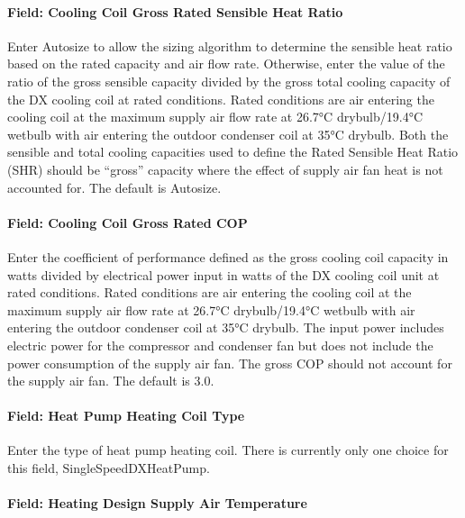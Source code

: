 \paragraph{Field: Cooling Coil Gross Rated Sensible Heat Ratio}\label{field-cooling-coil-gross-rated-sensible-heat-ratio-5}

Enter Autosize to allow the sizing algorithm to determine the sensible heat ratio based on the rated capacity and air flow rate. Otherwise, enter the value of the ratio of the gross sensible capacity divided by the gross total cooling capacity of the DX cooling coil at rated conditions. Rated conditions are air entering the cooling coil at the maximum supply air flow rate at 26.7°C drybulb/19.4°C wetbulb with air entering the outdoor condenser coil at 35°C drybulb. Both the sensible and total cooling capacities used to define the Rated Sensible Heat Ratio (SHR) should be ``gross'' capacity where the effect of supply air fan heat is not accounted for. The default is Autosize.

\paragraph{Field: Cooling Coil Gross Rated COP}\label{field-cooling-coil-gross-rated-cop-3}

Enter the coefficient of performance defined as the gross cooling coil capacity in watts divided by electrical power input in watts of the DX cooling coil unit at rated conditions. Rated conditions are air entering the cooling coil at the maximum supply air flow rate at 26.7°C drybulb/19.4°C wetbulb with air entering the outdoor condenser coil at 35°C drybulb. The input power includes electric power for the compressor and condenser fan but does not include the power consumption of the supply air fan. The gross COP should not account for the supply air fan. The default is 3.0.

\paragraph{Field: Heat Pump Heating Coil Type}\label{field-heat-pump-heating-coil-type-3}

Enter the type of heat pump heating coil. There is currently only one choice for this field, SingleSpeedDXHeatPump.

\paragraph{Field: Heating Design Supply Air Temperature}\label{field-heating-design-supply-air-temperature-1}

